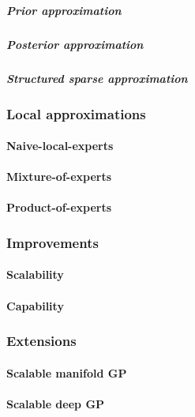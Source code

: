 \documentclass[12pt]{article}
\begin{document}
\subparagraph{Prior approximation}

\subparagraph{Posterior approximation}

\subparagraph{Structured sparse approximation}



\subsubsection{Local approximations}


\paragraph{Naive-local-experts}


\paragraph{Mixture-of-experts}


\paragraph{Product-of-experts}



\subsubsection{Improvements}


\paragraph{Scalability}


\paragraph{Capability}



\subsubsection{Extensions}


\paragraph{Scalable manifold GP}


\paragraph{Scalable deep GP}
\end{document}
